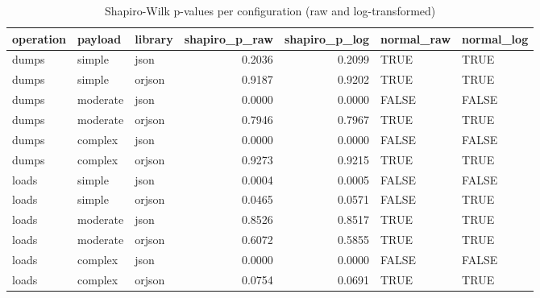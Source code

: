 \begin{table}[ht]
\centering
\begin{tabular}{lllrrll}
  \toprule
operation & payload & library & shapiro\_p\_raw & shapiro\_p\_log & normal\_raw & normal\_log \\ 
  \midrule
dumps & simple & json & 0.2036 & 0.2099 & TRUE & TRUE \\ 
  dumps & simple & orjson & 0.9187 & 0.9202 & TRUE & TRUE \\ 
  dumps & moderate & json & 0.0000 & 0.0000 & FALSE & FALSE \\ 
  dumps & moderate & orjson & 0.7946 & 0.7967 & TRUE & TRUE \\ 
  dumps & complex & json & 0.0000 & 0.0000 & FALSE & FALSE \\ 
  dumps & complex & orjson & 0.9273 & 0.9215 & TRUE & TRUE \\ 
  loads & simple & json & 0.0004 & 0.0005 & FALSE & FALSE \\ 
  loads & simple & orjson & 0.0465 & 0.0571 & FALSE & TRUE \\ 
  loads & moderate & json & 0.8526 & 0.8517 & TRUE & TRUE \\ 
  loads & moderate & orjson & 0.6072 & 0.5855 & TRUE & TRUE \\ 
  loads & complex & json & 0.0000 & 0.0000 & FALSE & FALSE \\ 
  loads & complex & orjson & 0.0754 & 0.0691 & TRUE & TRUE \\ 
   \bottomrule
\end{tabular}
\caption{Shapiro-Wilk p-values per configuration (raw and log-transformed)} 
\label{tab:normality}
\end{table}
